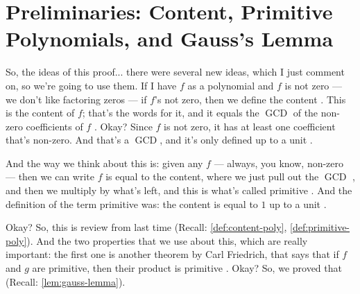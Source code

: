 \section{Preliminaries: Content, Primitive Polynomials, and Gauss's Lemma}

\begin{speech}[00:06:56 - 00:08:38]
So, the ideas of this proof... there were several new ideas, which I just comment on, so we're going to use them. If I have $f$ as a polynomial and $f$ is not zero  --- we don't like factoring zeros --- if $f$'s not zero, then we define the content . This is the content of $f$; that's the words for it, and it equals the $\operatorname{GCD}$ of the non-zero coefficients of $f$ . Okay? Since $f$ is not zero, it has at least one coefficient that's non-zero. And that's a $\operatorname{GCD}$, and it's only defined up to a unit .

And the way we think about this is: given any $f$ --- always, you know, non-zero  --- then we can write $f$ is equal to the content, where we just pull out the $\operatorname{GCD}$ , and then we multiply by what's left, and this is what's called primitive . And the definition of the term primitive was: the content is equal to $1$ up to a unit .

Okay? So, this is review from last time (Recall: \cref{def:content-poly}, \cref{def:primitive-poly}). And the two properties that we use about this, which are really important: the first one is another theorem by Carl Friedrich, that says that if $f$ and $g$ are primitive, then their product is primitive . Okay? So, we proved that (Recall: \cref{lem:gauss-lemma}).
\end{speech}

